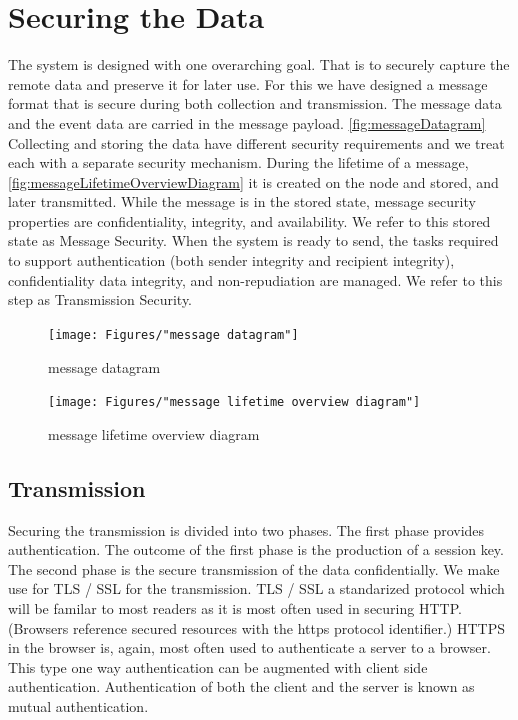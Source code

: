 \chapter{Securing the Data}
The system is designed with one overarching goal. That is to securely capture the remote data and preserve it for later use. For this we have designed a message format that is secure during both collection and transmission. The message data and the event data are carried in the message payload. \autoref{fig:messageDatagram} 
Collecting and storing the data have different security requirements and we treat each with a separate security mechanism. 
During the lifetime of a message, \autoref{fig:messageLifetimeOverviewDiagram} it is created on the node and stored, and later transmitted. While the message is in the stored state, message security properties are confidentiality, integrity, and availability. We refer to this stored state as Message Security. When the system is ready to send, the tasks required to support authentication (both sender integrity and recipient integrity), confidentiality data integrity, and non-repudiation are managed. We refer to this step as Transmission Security.
\begin{figure}
\centering
\texttt{[image: Figures/"message datagram"]}
\caption{message datagram}
\label{fig:messageDatagram}
\end{figure}

\begin{figure}
\centering
\texttt{[image: Figures/"message lifetime overview diagram"]}
\caption{message lifetime overview diagram}
\label{fig:messageLifetimeOverviewDiagram}
\end{figure}

\section{Transmission}
Securing the transmission is divided into two phases. The first phase provides authentication. The outcome of the first phase is the production of a session key. The second phase is the secure transmission of the data confidentially. 
We make use for TLS / SSL for the transmission. TLS / SSL a standarized protocol which will be familar to most readers as it is most often used in securing HTTP. (Browsers reference secured resources with the https protocol identifier.) HTTPS in the browser is, again, most often used to authenticate a server to a browser. This type one way authentication can be augmented with client side authentication. Authentication of both the client and the server is known as mutual authentication.  

